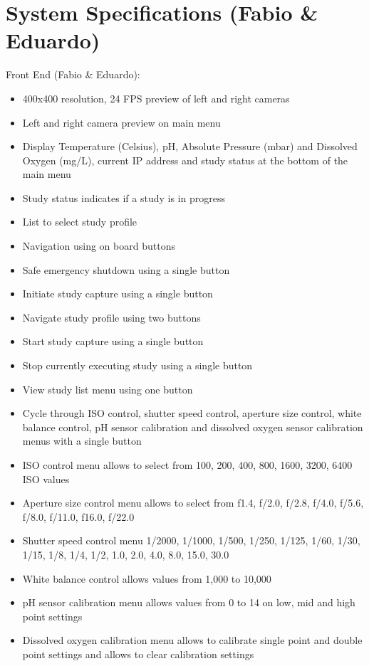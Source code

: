 \section{System Specifications (Fabio \& Eduardo)}
Front End (Fabio \& Eduardo):
\begin{itemize}
	\item 400x400 resolution, 24 FPS preview of left and right cameras
	\item Left and right camera preview on main menu
	\item Display Temperature (Celsius), pH, Absolute Pressure (mbar) and Dissolved Oxygen (mg/L), current IP address and study status at the bottom of the main menu
	\item Study status indicates if a study is in progress
	\item List to select study profile
	\item Navigation using on board buttons
	\item Safe emergency shutdown using a single button
	\item Initiate study capture using a single button
	\item Navigate study profile using two buttons
	\item Start study capture using a single button
	\item Stop currently executing study using a single button
	\item View study list menu using one button
	\item Cycle through ISO control, shutter speed control, aperture size control, white balance control, pH sensor calibration and dissolved oxygen sensor calibration menus with a single button
	\item ISO control menu allows to select from 100, 200, 400, 800, 1600, 3200, 6400 ISO values
	\item Aperture size control menu allows to select from f1.4, f/2.0, f/2.8, f/4.0, f/5.6, f/8.0, f/11.0, f16.0, f/22.0
	\item Shutter speed control menu 1/2000, 1/1000, 1/500, 1/250, 1/125, 1/60, 1/30, 1/15, 1/8, 1/4, 1/2, 1.0, 2.0, 4.0, 8.0, 15.0, 30.0
	\item White balance control allows values from 1,000 to 10,000
	\item pH sensor calibration menu allows values from 0 to 14 on low, mid and high point settings
	\item Dissolved oxygen calibration menu allows to calibrate single point and double point settings and allows to clear calibration settings
\end{itemize}
